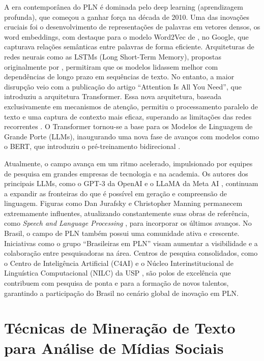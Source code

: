 A era contemporânea do PLN é dominada pelo deep learning (aprendizagem profunda), que começou a ganhar força na década de 2010. Uma das inovações cruciais foi o desenvolvimento de representações de palavras em vetores densos, os word embeddings, com destaque para o modelo Word2Vec de , no Google, que capturava relações semânticas entre palavras de forma eficiente. Arquiteturas de redes neurais como as LSTMs (Long Short-Term Memory), propostas originalmente por , permitiram que os modelos lidassem melhor com dependências de longo prazo em sequências de texto. No entanto, a maior disrupção veio com a publicação do artigo ``Attention Is All You Need'', que introduziu a arquitetura Transformer. Essa nova arquitetura, baseada exclusivamente em mecanismos de atenção, permitiu o processamento paralelo de texto e uma captura de contexto mais eficaz, superando as limitações das redes recorrentes \cite{vaswani2017}. O Transformer tornou-se a base para os Modelos de Linguagem de Grande Porte (LLMs), inaugurando uma nova fase de avanços com modelos como o BERT, que introduziu o pré-treinamento bidirecional \cite{devlin2019}.

Atualmente, o campo avança em um ritmo acelerado, impulsionado por equipes de pesquisa em grandes empresas de tecnologia e na academia. Os autores dos principais LLMs, como o GPT-3 da OpenAI \cite{brown2020} e o LLaMA da Meta AI \cite{touvron2023}, continuam a expandir as fronteiras do que é possível em geração e compreensão de linguagem. Figuras como Dan Jurafsky e Christopher Manning permanecem extremamente influentes, atualizando constantemente suas obras de referência, como \emph{Speech and Language Processing} \cite{jurafsky2026}, para incorporar os últimos avanços. No Brasil, o campo de PLN também possui uma comunidade ativa e crescente. Iniciativas como o grupo ``Brasileiras em PLN'' \cite{brasileiraspln2026} visam aumentar a visibilidade e a colaboração entre pesquisadoras na área. Centros de pesquisa consolidados, como o Centro de Inteligência Artificial (C4AI) e o Núcleo Interinstitucional de Linguística Computacional (NILC) da USP \cite{nilc2026}, são polos de excelência que contribuem com pesquisa de ponta e para a formação de novos talentos, garantindo a participação do Brasil no cenário global de inovação em PLN.

\section{Técnicas de Mineração de Texto para Análise de Mídias Sociais}

